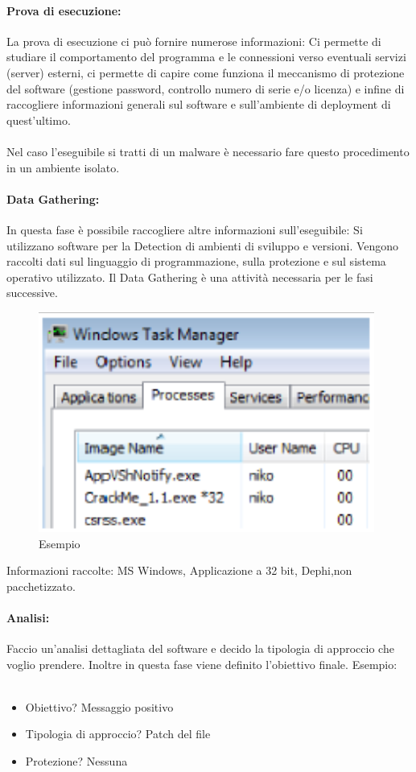 \documentclass{article}
\begin{document}
\paragraph{Prova di esecuzione:}
\noindent
La prova di esecuzione ci può fornire numerose informazioni:
Ci permette di studiare il comportamento del programma e le connessioni verso eventuali servizi 
(server) esterni, ci permette di capire come funziona il meccanismo di protezione del software 
(gestione password, controllo numero di serie e/o licenza) e infine di raccogliere informazioni 
generali sul software e sull’ambiente di deployment di quest’ultimo.\\\\
Nel caso l’eseguibile si tratti di un malware è necessario fare questo procedimento in un 
ambiente isolato. 
\paragraph{Data Gathering:}
\noindent
In questa fase è possibile raccogliere altre informazioni sull’eseguibile:
Si utilizzano software per la Detection di ambienti di sviluppo e versioni.
Vengono raccolti dati sul linguaggio di programmazione, sulla protezione e sul 
sistema operativo utilizzato. Il Data Gathering è una attività necessaria per le fasi successive.
\begin{figure}[H]
    \center
    \includegraphics[scale=0.3]{images/RCE1.png}
    \caption{Esempio}\label{fig:1}
\end{figure}
\noindent
Informazioni raccolte: MS Windows, Applicazione a 32 bit, Dephi,non pacchetizzato.
\paragraph{Analisi:}
Faccio un’analisi dettagliata del software e decido la tipologia di approccio che voglio prendere.
Inoltre in questa fase viene definito l’obiettivo finale.
Esempio:\\\\
\begin{itemize}
    \item Obiettivo? Messaggio positivo
    \item Tipologia di approccio? Patch del file
    \item Protezione? Nessuna
\end{itemize}
\end{document}
